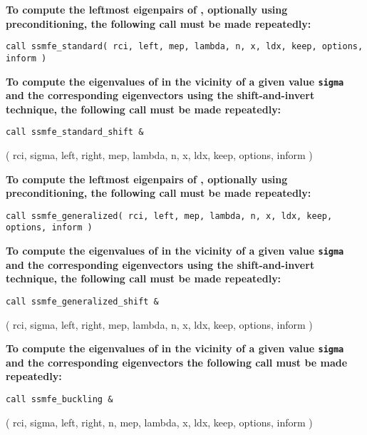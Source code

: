 {\bf
To compute
the leftmost eigenpairs of ,
optionally using preconditioning,
the following call must be made repeatedly:
}

\medskip
{\tt call
ssmfe\_standard( rci, left, mep, lambda, n, x, ldx, keep, options, inform )
}

\medskip
\noindent
{\bf
To compute the eigenvalues of  %
in the vicinity of 
a given value {\tt sigma}
and the corresponding eigenvectors using the shift-and-invert technique,
the following call must be made repeatedly:
}

\medskip
{\tt call
ssmfe\_standard\_shift \&

\hspace{8mm} 
( rci, sigma, left, right, mep, lambda, n, x, ldx, keep, options, inform )
}

\medskip
\noindent
{\bf
To compute %
the leftmost eigenpairs of ,
optionally using preconditioning,
the following call must be made repeatedly:
}

\medskip
{\tt call
ssmfe\_generalized( rci, left, mep, lambda, n, x, ldx, keep, options, inform )
}

\medskip
\noindent
{\bf
To compute the eigenvalues of  %
in the vicinity of 
a given value {\tt sigma}
and the corresponding eigenvectors using the shift-and-invert technique,
the following call must be made repeatedly:
}

\medskip
{\tt call
ssmfe\_generalized\_shift \&

\hspace{8mm} 
( rci, sigma, left, right, mep, lambda, n, x, ldx, keep, options, inform )
}

\medskip
\noindent
{\bf
To compute the eigenvalues of  %
in the vicinity of 
a given value {\tt sigma}
and the corresponding eigenvectors %
the following call must be made repeatedly:
}

\medskip
{\tt call
ssmfe\_buckling \&

\hspace{8mm} 
( rci, sigma, left, right, n, mep, lambda, x, ldx, keep, options, inform )
}


